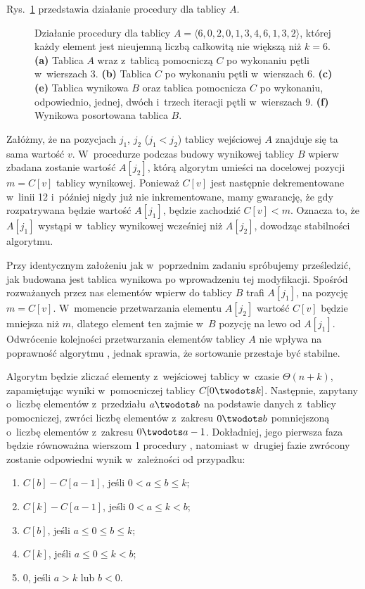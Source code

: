 
\exercise %
Rys.\ \ref{fig:8.2-1} przedstawia działanie procedury  dla tablicy $A$.
\begin{figure}[!ht]
	\centering 
	\caption{Działanie procedury  dla tablicy $A=\langle6,0,2,0,1,3,4,6,1,3,2\rangle$, której każdy element jest nieujemną liczbą całkowitą nie większą niż $k=6$.
{\sffamily\bfseries(a)} Tablica $A$ wraz z~tablicą pomocniczą $C$ po wykonaniu pętli w~wierszach 3.
{\sffamily\bfseries(b)} Tablica $C$ po wykonaniu pętli w~wierszach 6.
{\sffamily\bfseries(c)\nbendash(e)} Tablica wynikowa $B$ oraz tablica pomocnicza $C$ po wykonaniu, odpowiednio, jednej, dwóch i~trzech iteracji pętli  w~wierszach 9.
{\sffamily\bfseries(f)} Wynikowa posortowana tablica $B$.} \label{fig:8.2-1}
\end{figure}

\exercise %
Załóżmy, że na pozycjach $j_1$, $j_2$ ($j_1<j_2$) tablicy wejściowej $A$ znajduje się ta sama wartość $v$.
W~procedurze  podczas budowy wynikowej tablicy $B$ wpierw zbadana zostanie wartość $A[j_2]$, którą algorytm umieści na docelowej pozycji $m=C[v]$ tablicy wynikowej.
Ponieważ $C[v]$ jest następnie dekrementowane w~linii 12 i~później nigdy już nie inkrementowane, mamy gwarancję, że gdy rozpatrywana będzie wartość $A[j_1]$, będzie zachodzić $C[v]<m$.
Oznacza to, że $A[j_1]$ wystąpi w~tablicy wynikowej wcześniej niż $A[j_2]$, dowodząc stabilności algorytmu.

\exercise %
Przy identycznym założeniu jak w~poprzednim zadaniu spróbujemy prześledzić, jak budowana jest tablica wynikowa po wprowadzeniu tej modyfikacji.
Spośród rozważanych przez nas elementów wpierw do tablicy $B$ trafi $A[j_1]$, na pozycję $m=C[v]$.
W~momencie przetwarzania elementu $A[j_2]$ wartość $C[v]$ będzie mniejsza niż $m$, dlatego element ten zajmie w~$B$ pozycję na lewo od $A[j_1]$.
Odwrócenie kolejności przetwarzania elementów tablicy $A$ nie wpływa na poprawność algorytmu , jednak sprawia, że sortowanie przestaje być stabilne.

\exercise %
Algorytm będzie zliczać elementy z~wejściowej tablicy w~czasie $\Theta(n+k)$, zapamiętując wyniki w~pomocniczej tablicy $C[0\twodots k]$.
Następnie, zapytany o~liczbę elementów z~przedziału $a\twodots b$ na podstawie danych z~tablicy pomocniczej, zwróci liczbę elementów z~zakresu $0\twodots b$ pomniejszoną o~liczbę elementów z~zakresu $0\twodots a-1$.
Dokładniej, jego pierwsza faza będzie równoważna wierszom 1 procedury , natomiast w~drugiej fazie zwrócony zostanie odpowiedni wynik w~zależności od przypadku:
\begin{enumerate}
	\renewcommand{\labelenumi}{(\roman{enumi})}
	\item $C[b]-C[a-1]$, jeśli $0<a\le b\le k$;
	\item $C[k]-C[a-1]$, jeśli $0<a\le k<b$;
	\item $C[b]$, jeśli $a\le0\le b\le k$;
	\item $C[k]$, jeśli $a\le0\le k<b$;
	\item 0, jeśli $a>k$ lub $b<0$.
\end{enumerate}
